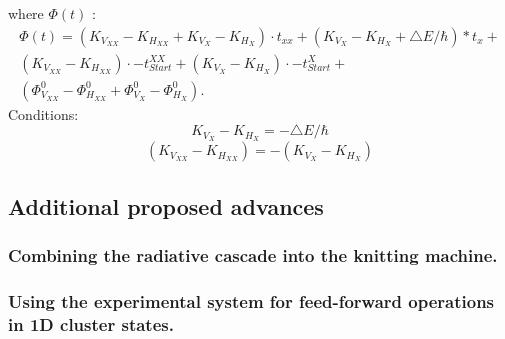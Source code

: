 where $\Phi(t)$ :
\begin{equation}
\begin{split}  
	\Phi(t) = (K_{V_{XX}}-K_{H_{XX}}+K_{V_X} - K_{H_X})\cdot t_{xx}+(K_{V_X}-K_{H_X} + \triangle E/\hbar)*t_x +\\
 (K_{V_{XX}} - K_{H_{XX}})\cdot-t^{XX}_{Start} +(K_{V_X}-K_{H_X})\cdot-t^X_{Start}+\\
 (\Phi^0_{V_{XX}}-\Phi^0_{H_{XX}}+\Phi^0_{V_{X}}-\Phi^0_{H_{X}}).
 \end{split}
\end{equation}
Conditions:
\begin{equation}
	K_{V_X}-K_{H_X} = -\triangle E/\hbar
\end{equation}
\begin{equation}
	(K_{V_{XX}} -K_{H_{XX}}) = -(K_{V_X}-K_{H_X})
\end{equation}
\subsection{Additional proposed advances}
\subsubsection{Combining the radiative cascade into the knitting machine.}
\subsubsection{Using the experimental system for feed-forward operations in 1D cluster states.}